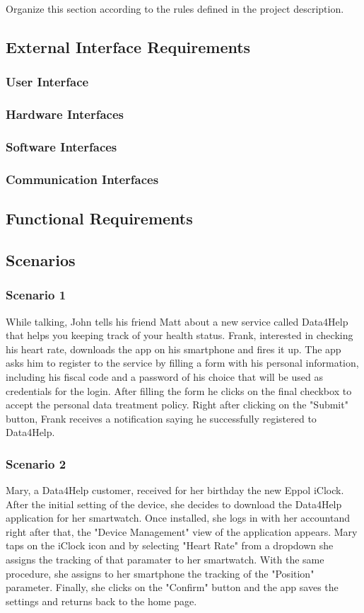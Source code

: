 Organize this section according to the rules defined in the project description. 
\subsection{External Interface Requirements}
\subsubsection{User Interface}
\subsubsection{Hardware Interfaces}
\subsubsection{Software Interfaces}
\subsubsection{Communication Interfaces}
\subsection{Functional Requirements}
\subsection{Scenarios}
\subsubsection{Scenario 1}
While talking, John tells his friend Matt about a new service called Data4Help that helps you keeping track of your health status. Frank, interested in checking his heart rate, downloads the app on his smartphone and fires it up. The app asks him to register to the service by filling a form with his personal information, including his fiscal code and a password of his choice that will be used as credentials for the login. 
After filling the form he clicks on the final checkbox to accept the personal data treatment policy.
Right after clicking on the "Submit" button, Frank receives a notification saying he successfully registered to Data4Help.
\subsubsection{Scenario 2}
Mary, a Data4Help customer, received for her birthday the new Eppol iClock. After the initial setting of the device, she decides to download the Data4Help application for her smartwatch. Once installed, she logs in with her accountand right after that, the "Device Management"
 view of the application appears. Mary taps on the iClock icon and by selecting "Heart Rate" from a dropdown she assigns the tracking of that paramater to her smartwatch. With the same procedure, she assigns to her smartphone the tracking of the "Position" parameter.
Finally, she clicks on the "Confirm" button and the app saves the settings and returns back to the home page.
